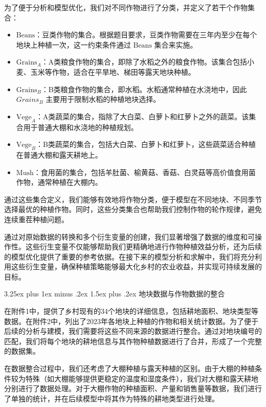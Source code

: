 \documentclass[12pt,a4paper]{nmmcm}
\makeatletter
\renewcommand\subsection{\@startsection{subsection}{2}{0pt}%
    {3.25ex plus 1ex minus .2ex}%
    {1.5ex plus .2ex}%
    {\normalfont\Large\bfseries}}
\makeatother
\begin{document}
为了便于分析和模型优化，我们对不同作物进行了分类，并定义了若干个作物集合：

\begin{itemize}
  \item $\text{Beans}$：豆类作物的集合。根据题目要求，豆类作物需要在三年内至少在每个地块上种植一次，这一约束条件通过 $\text{Beans}$ 集合来实施。
  \item $\text{Grains}_A$：A类粮食作物的集合，即除了水稻之外的粮食作物。该集合包括小麦、玉米等作物，适合在平旱地、梯田等露天地块种植。
  \item $\text{Grains}_B$：B类粮食作物的集合，即水稻。水稻通常种植在水浇地中，因此 $Grains_B$ 主要用于限制水稻的种植地块选择。
  \item $\text{Vege}_A$：A类蔬菜的集合，指除了大白菜、白萝卜和红萝卜之外的蔬菜。该集合用于普通大棚和水浇地的种植规划。
  \item $\text{Vege}_B$：B类蔬菜的集合，包括大白菜、白萝卜和红萝卜，这些蔬菜适合种植在普通大棚和露天耕地上。
  \item $\text{Mush}$：食用菌的集合，包括羊肚菌、榆黄菇、香菇、白灵菇等高价值食用菌作物，通常种植在大棚内。
\end{itemize}

通过这些集合定义，我们能够有效地将作物分类，便于模型在不同地块、不同季节选择最优的种植作物。同时，这些分类集合也帮助我们控制作物的轮作规律，避免连续重茬种植问题。

通过对原始数据的转换和多个衍生变量的创建，我们显著增强了数据的维度和可操作性。这些衍生变量不仅能够帮助我们更精确地进行作物种植效益分析，还为后续的模型优化提供了重要的参考依据。在接下来的模型分析和求解中，我们将充分利用这些衍生变量，确保种植策略能够最大化乡村的农业收益，并实现可持续发展的目标。

\subsection{地块数据与作物数据的整合}

在附件1中，提供了乡村现有的34个地块的详细信息，包括耕地面积、地块类型等数据。在附件2中，列出了2023年各地块上种植的作物和相关统计数据。为了便于后续的分析与建模，我们需要将这些不同来源的数据进行整合。通过对地块编号的匹配，我们将每个地块的耕地信息与其作物种植数据进行了合并，形成了一个完整的数据集。

在数据整合过程中，我们还考虑了大棚种植与露天种植的区别。由于大棚的种植条件较为特殊（如大棚能够提供更稳定的温度和湿度条件），我们对大棚和露天耕地分别进行了数据处理。对于大棚作物的种植面积、产量和销售量等数据，我们进行了单独的统计，并在后续模型中将其作为特殊的耕地类型进行处理。
\end{document}

